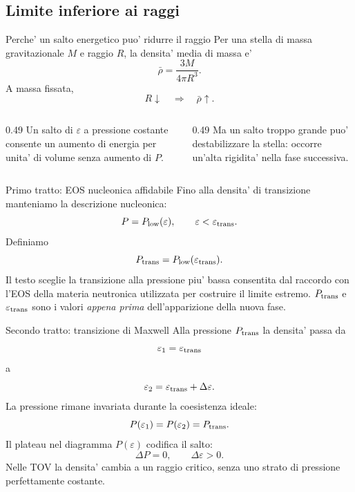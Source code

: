 \subsection{Limite inferiore ai raggi}
\begin{frame}{Perche' un salto energetico puo' ridurre il raggio}
\small
Per una stella di massa gravitazionale $M$ e raggio $R$, la densita' media di massa e'
\[
\bar\rho=\frac{3M}{4\pi R^3}.
\]
A massa fissata,
\[
R\downarrow\quad\Longrightarrow\quad\bar\rho\uparrow.
\]
\begin{columns}[T,onlytextwidth]
\begin{column}{0.49\textwidth}
Un salto di $\varepsilon$ a pressione costante consente un aumento di energia per unita' di volume senza aumento di $P$.
\end{column}
\begin{column}{0.49\textwidth}
Ma un salto troppo grande puo' destabilizzare la stella: occorre un'alta rigidita' nella fase successiva.
\end{column}
\end{columns}
\end{frame}

\begin{frame}{Primo tratto: EOS nucleonica affidabile}
\small
Fino alla densita' di transizione manteniamo la descrizione nucleonica:
\[
P=P_{\rm low}(\varepsilon),
\qquad\varepsilon<\varepsilon_{\rm trans}.
\]
Definiamo
\[
P_{\rm trans}=P_{\rm low}(\varepsilon_{\rm trans}).
\]
\medskip
Il testo sceglie la transizione alla pressione piu' bassa consentita dal raccordo con l'EOS della materia neutronica utilizzata per costruire il limite estremo.
\medskip
$P_{\rm trans}$ e $\varepsilon_{\rm trans}$ sono i valori \textit{appena prima} dell'apparizione della nuova fase.
\end{frame}

\begin{frame}{Secondo tratto: transizione di Maxwell}
\small
Alla pressione $P_{\rm trans}$ la densita' passa da
\[
\varepsilon_1=\varepsilon_{\rm trans}
\]
a
\[
\varepsilon_2=\varepsilon_{\rm trans}+\Delta\varepsilon.
\]
La pressione rimane invariata durante la coesistenza ideale:
\[
P(\varepsilon_1)=P(\varepsilon_2)=P_{\rm trans}.
\]
Il plateau nel diagramma $P(\varepsilon)$ codifica il salto:
\[
\Delta P=0,\qquad\Delta\varepsilon>0.
\]
Nelle TOV la densita' cambia a un raggio critico, senza uno strato di pressione perfettamente costante.
\end{frame}

